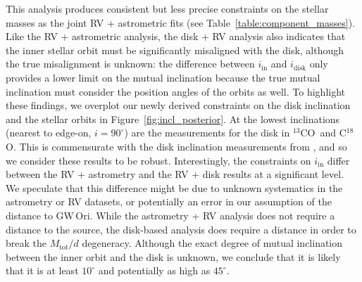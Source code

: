 \documentclass[twocolumn]{aastex61}
\newcommand{\obj}{GW\,Ori}
\newcommand{\thirteen}{${}^{13}$CO}
\newcommand{\eighteen}{C${}^{18}$O}
\begin{document}
This analysis produces consistent but less precise constraints on the stellar masses as the joint RV + astrometric fits (see Table~\ref{table:component_masses}). Like the RV + astrometric analysis, the disk + RV analysis also indicates that the inner stellar orbit must be significantly misaligned with the disk, although the true misalignment is unknown: the difference between $i_\mathrm{in}$ and $i_\mathrm{disk}$ only provides a lower limit on the mutual inclination because the true mutual inclination must consider the position angles of the orbits as well. To highlight these findings, we overplot our newly derived constraints on the disk inclination and the stellar orbits in Figure~\ref{fig:incl_posterior}.
At the lowest inclinations (nearest to edge-on, $i = 90^\circ$) are the measurements for the disk in \thirteen\ and \eighteen. This is commensurate with the disk inclination measurements from \citet{fang17}, and so we consider these results to be robust.
Interestingly, the constraints on $i_\mathrm{in}$ differ between the RV + astrometry and the RV + disk results at a significant level. We speculate that this difference might be due to unknown systematics in the astrometry or RV datasets, or potentially an error in our assumption of the distance to \obj. While the astrometry + RV analysis does not require a distance to the source, the disk-based analysis does require a distance in order to break the $M_\mathrm{tot} / d$ degeneracy. Although the exact degree of mutual inclination between the inner orbit and the disk is unknown, we conclude that it is likely that it is at least $10^\circ$ and potentially as high as $45^\circ$.
\end{document}

